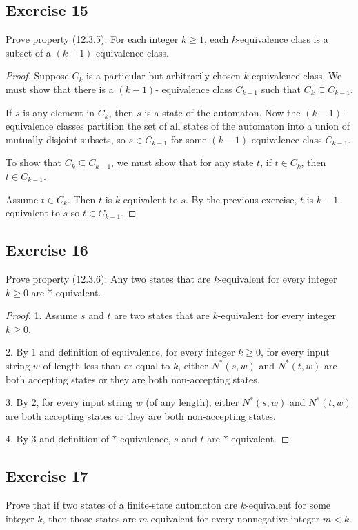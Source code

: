 \documentclass[14pt]{extarticle}
\begin{document}
\subsection{Exercise 15}
Prove property (12.3.5): For each integer \(k \geq 1\), each \(k\)-equivalence class is a subset of a 
\((k - 1)\)-equivalence class.

\begin{proof}
Suppose \(C_k\) is a particular but arbitrarily chosen \(k\)-equivalence class. We must show that there is a \((k - 1)\)-
equivalence class \(C_{k-1}\) such that \(C_k \subseteq C_{k-1}\).

If \(s\) is any element in \(C_k\), then \(s\) is a state of the automaton. Now the \((k - 1)\)-equivalence classes 
partition the set of all states of the automaton into a union of mutually disjoint subsets, so \(s \in C_{k-1}\) for some 
\((k - 1)\)-equivalence class \(C_{k-1}\).

To show that \(C_k \subseteq C_{k-1}\), we must show that for any state \(t\), if \(t \in C_k\), then \(t \in C_{k-1}\).

Assume \(t \in C_k\). Then \(t\) is \(k\)-equivalent to \(s\). By the previous exercise, \(t\) is \(k-1\)-equivalent to \(s\)
so \(t \in C_{k-1}\).
\end{proof}

\subsection{Exercise 16}
Prove property (12.3.6): Any two states that are \(k\)-equivalent for every integer \(k \geq 0\) are *-equivalent.

\begin{proof}
1. Assume \(s\) and \(t\) are two states that are \(k\)-equivalent for every integer \(k \geq 0\).

2. By 1 and definition of equivalence, for every integer \(k \geq 0\), for every input string \(w\) of length less than or 
equal to \(k\), either \(N^*(s, w)\) and \(N^*(t, w)\) are 
both accepting states or they are both non-accepting states.

3. By 2, for every input string \(w\) (of any length), either \(N^*(s, w)\) and \(N^*(t, w)\) are both accepting states or 
they are both non-accepting states.

4. By 3 and definition of \(*\)-equivalence, \(s\) and \(t\) are \(*\)-equivalent.
\end{proof}

\subsection{Exercise 17}
Prove that if two states of a finite-state automaton are \(k\)-equivalent for some integer \(k\), then those states are 
\(m\)-equivalent for every nonnegative integer \(m < k\).
\end{document}
